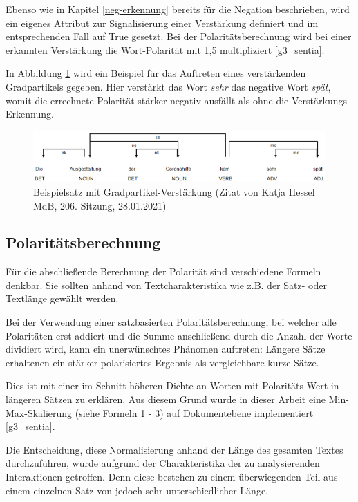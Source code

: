 Ebenso wie in Kapitel \ref{neg-erkennung} bereits für die Negation beschrieben, wird ein eigenes Attribut zur Signalisierung einer Verstärkung definiert und im entsprechenden Fall auf True gesetzt. 
Bei der Polaritätsberechnung wird bei einer erkannten Verstärkung die Wort-Polarität mit 1,5 multipliziert \ref{g3_sentia}. 

In Abbildung \ref{hessel} wird ein Beispiel für das Auftreten eines verstärkenden Gradpartikels gegeben. 
Hier verstärkt das Wort \textit{sehr} das negative Wort \textit{spät}, womit die errechnete Polarität stärker negativ ausfällt als ohne die Verstärkungs-Erkennung. 

\begin{figure}[htb]
\centerline{\includegraphics[width=1\textwidth]{hessel.png}}
\caption{Beispielsatz mit Gradpartikel-Verstärkung (Zitat von Katja Hessel MdB, 206. Sitzung, 28.01.2021)}
\label{hessel}
\end{figure}

\subsection{Polaritätsberechnung}
\label{polberechnung}
Für die abschließende Berechnung der Polarität sind verschiedene Formeln denkbar. 
Sie sollten anhand von Textcharakteristika wie z.B. der Satz- oder Textlänge gewählt werden. 

Bei der Verwendung einer satzbasierten Polaritätsberechnung, bei welcher alle Polaritäten erst addiert und die Summe anschließend durch die Anzahl der Worte dividiert wird, kann ein unerwünschtes Phänomen auftreten: 
Längere Sätze erhaltenen ein stärker polarisiertes Ergebnis als vergleichbare kurze Sätze. 

Dies ist mit einer im Schnitt höheren Dichte an Worten mit Polaritäts-Wert in längeren Sätzen zu erklären. 
Aus diesem Grund wurde in dieser Arbeit eine Min-Max-Skalierung (siehe Formeln 1 - 3) auf Dokumentebene implementiert \ref{g3_sentia}. 

Die Entscheidung, diese Normalisierung anhand der Länge des gesamten Textes durchzuführen, wurde aufgrund der Charakteristika der zu analysierenden Interaktionen getroffen. 
Denn diese bestehen zu einem überwiegenden Teil aus einem einzelnen Satz von jedoch sehr unterschiedlicher Länge. 

